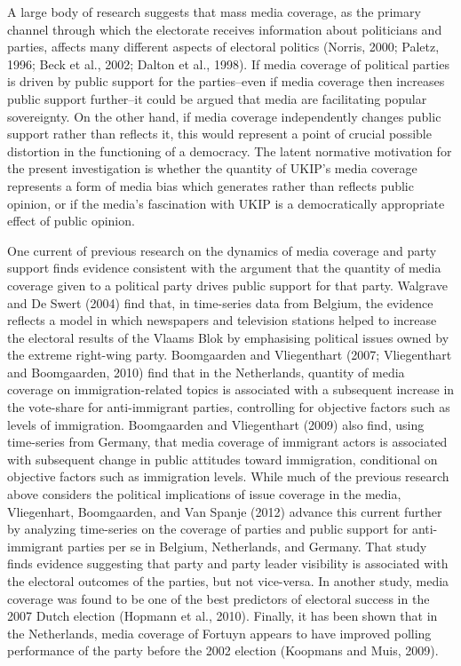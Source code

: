 \documentclass[12pt,article]{article}
\begin{document}
A large body of research suggests that mass media coverage, as the
primary channel through which the electorate receives information about
politicians and parties, affects many different aspects of electoral
politics (Norris, 2000; Paletz, 1996; Beck et al., 2002; Dalton et al.,
1998). If media coverage of political parties is driven by public
support for the parties--even if media coverage then increases public
support further--it could be argued that media are facilitating popular
sovereignty. On the other hand, if media coverage independently changes
public support rather than reflects it, this would represent a point of
crucial possible distortion in the functioning of a democracy. The
latent normative motivation for the present investigation is whether the
quantity of UKIP's media coverage represents a form of media bias which
generates rather than reflects public opinion, or if the media's
fascination with UKIP is a democratically appropriate effect of public
opinion.

One current of previous research on the dynamics of media coverage and
party support finds evidence consistent with the argument that the
quantity of media coverage given to a political party drives public
support for that party. Walgrave and De Swert (2004) find that, in
time-series data from Belgium, the evidence reflects a model in which
newspapers and television stations helped to increase the electoral
results of the Vlaams Blok by emphasising political issues owned by the
extreme right-wing party. Boomgaarden and Vliegenthart (2007;
Vliegenthart and Boomgaarden, 2010) find that in the Netherlands,
quantity of media coverage on immigration-related topics is associated
with a subsequent increase in the vote-share for anti-immigrant parties,
controlling for objective factors such as levels of immigration.
Boomgaarden and Vliegenthart (2009) also find, using time-series from
Germany, that media coverage of immigrant actors is associated with
subsequent change in public attitudes toward immigration, conditional on
objective factors such as immigration levels. While much of the previous
research above considers the political implications of issue coverage in
the media, Vliegenhart, Boomgaarden, and Van Spanje (2012) advance this
current further by analyzing time-series on the coverage of parties and
public support for anti-immigrant parties per se in Belgium,
Netherlands, and Germany. That study finds evidence suggesting that
party and party leader visibility is associated with the electoral
outcomes of the parties, but not vice-versa. In another study, media
coverage was found to be one of the best predictors of electoral success
in the 2007 Dutch election (Hopmann et al., 2010). Finally, it has been
shown that in the Netherlands, media coverage of Fortuyn appears to have
improved polling performance of the party before the 2002 election
(Koopmans and Muis, 2009).
\end{document}
